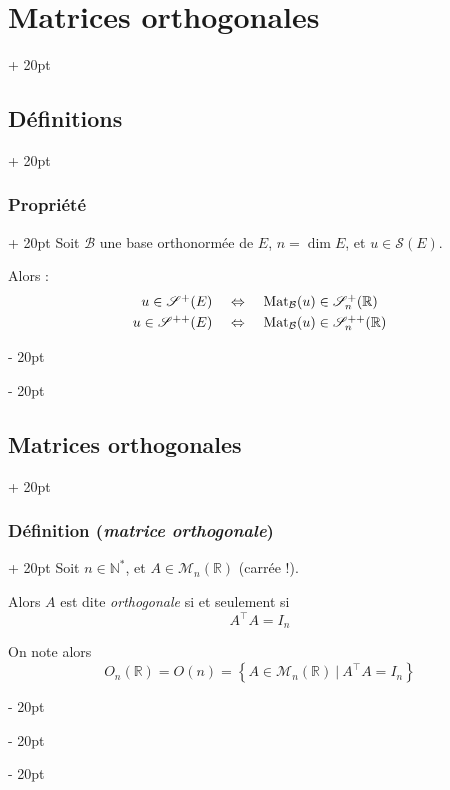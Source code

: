 \documentclass[a4paper, 12pt, twoside]{article}
\newcommand{\N}{\mathbb{N}} %
\newcommand{\R}{\mathbb{R}} %
\newcommand{\set}[1]{\left\{ #1 \right\}}
\newcommand{\ssi}{\ \Leftrightarrow \ }
\newcommand{\ind}[1][20pt]{\advance\leftskip + #1}
\newcommand{\deind}[1][20pt]{\advance\leftskip - #1}
\newenvironment{indt}[2][20pt]{#2 \par \ind[#1]}{\par \deind} %
\begin{document}
\begin{indt}{\section{Matrices orthogonales}}
\begin{indt}{\subsection{Définitions}}
            \vspace{12pt}
            
            \begin{indt}{\subsubsection{Propriété}}
                Soit $\mathcal B$ une base orthonormée de $E$, $n = \dim E$, et $u \in \mathscr S(E)$.

                Alors :
                \[
                    \begin{array}{rcl}
                        u \in \mathscr S^+(E)
                        &\ssi&
                        \mathrm{Mat}_{\mathcal B}(u) \in \mathscr S_n^+(\R)
                        \vspace{3pt}
                        \\
                        u \in \mathscr S^{++}(E)
                        &\ssi&
                        \mathrm{Mat}_{\mathcal B}(u) \in \mathscr S_n^{++}(\R)
                    \end{array}
                \]
            \end{indt}
        \end{indt}

        \vspace{12pt}
        
        \begin{indt}{\subsection{Matrices orthogonales}}
            \begin{indt}{\subsubsection{Définition (\textit{matrice orthogonale})}}
                Soit $n \in \N^*$, et $A \in \mathcal M_n(\R)$ (carrée !).

                Alors $A$ est dite \emph{orthogonale} si et seulement si
                \[
                    A^\top A = I_n
                \]

                On note alors
                \[
                    O_n(\R) = O(n) = \set{A \in \mathcal M_n(\R)\ |\ A^\top A = I_n}
                \]
            \end{indt}

            \vspace{12pt}
            

\end{indt}
\end{indt}
\end{document}
